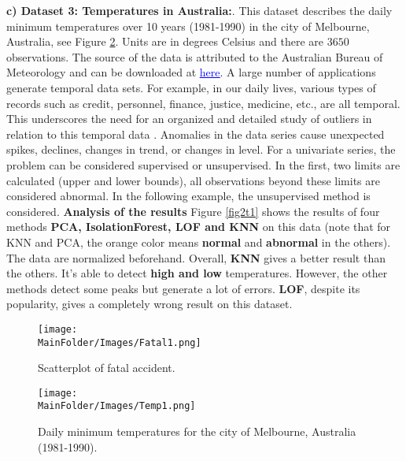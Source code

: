 \noindent\textbf{c) Dataset 3: Temperatures in Australia:}.
This dataset describes the daily minimum temperatures over 10 years (1981-1990) in the city of Melbourne, Australia, see Figure \ref{fig2t}. Units are in degrees Celsius and there are $3650$ observations. The source of the data is attributed to the Australian Bureau of Meteorology and can be downloaded at \href{https://machinelearningmastery.com/time-series-data-visualization-with-python/}{\textcolor{blue}{\underline{here}}}. A large number of applications generate temporal data sets. For example, in our daily lives, various types of records such as credit, personnel, finance, justice, medicine, etc., are all temporal. This underscores the need for an organized and detailed study of outliers in relation to this temporal data \cite{A5}. Anomalies in the data series cause unexpected spikes, declines, changes in trend, or changes in level. For a univariate series, the problem can be considered supervised or unsupervised. In the first, two limits are calculated (upper and lower bounds), all observations beyond these limits are considered abnormal. In the following example, the unsupervised method is considered.\newl
\noindent\textbf{Analysis of the results} 
Figure \eqref{fig2t1} shows the results of four methods \textbf{PCA, IsolationForest, LOF and KNN} on this data (note that for KNN and PCA, the orange color means \textbf{normal} and \textbf{abnormal} in the others). The data are normalized beforehand. Overall, \textbf{KNN} gives a better result than the others. It's able to detect \textbf{high and low} temperatures. However, the other methods detect some peaks but generate a lot of errors. \textbf{LOF}, despite its popularity, gives a completely wrong result on this dataset. 


\begin{figure}[H]
    \centering
    \texttt{[image: \\MainFolder/Images/Fatal1.png]}
    \caption{Scatterplot of fatal accident.}%
    \label{fig2a}
\end{figure}

\begin{figure}[H]
    \centering
    \texttt{[image: \\MainFolder/Images/Temp1.png]}
    \caption{Daily minimum temperatures for the city of Melbourne, Australia (1981-1990).}%
    \label{fig2t}
\end{figure}




